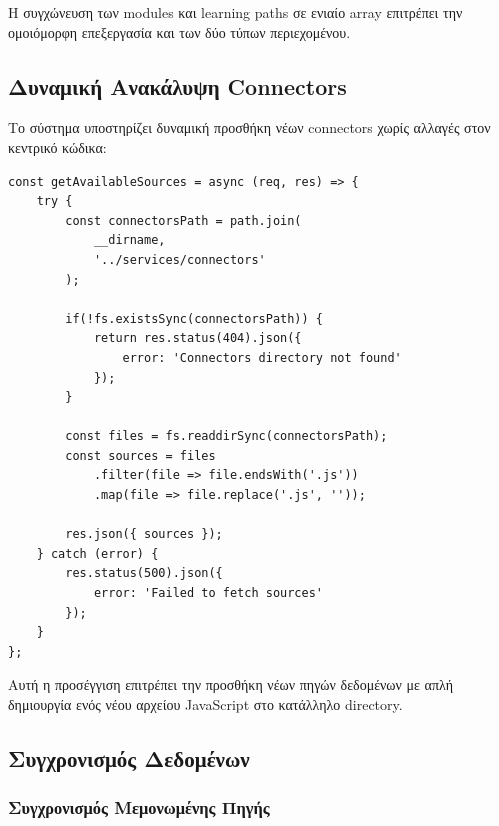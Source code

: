 \documentclass[a4paper,12pt]{article}
\begin{document}
Η συγχώνευση των modules και learning paths σε ενιαίο array επιτρέπει την ομοιόμορφη επεξεργασία και των δύο τύπων περιεχομένου.

\subsection{Δυναμική Ανακάλυψη Connectors}

Το σύστημα υποστηρίζει δυναμική προσθήκη νέων connectors χωρίς αλλαγές στον κεντρικό κώδικα:

\begin{verbatim}
const getAvailableSources = async (req, res) => {
    try {
        const connectorsPath = path.join(
            __dirname, 
            '../services/connectors'
        );
        
        if(!fs.existsSync(connectorsPath)) {
            return res.status(404).json({ 
                error: 'Connectors directory not found' 
            });
        }
        
        const files = fs.readdirSync(connectorsPath);
        const sources = files
            .filter(file => file.endsWith('.js'))
            .map(file => file.replace('.js', ''));
            
        res.json({ sources });
    } catch (error) {
        res.status(500).json({ 
            error: 'Failed to fetch sources' 
        });
    }
};
\end{verbatim}

Αυτή η προσέγγιση επιτρέπει την προσθήκη νέων πηγών δεδομένων με απλή δημιουργία ενός νέου αρχείου JavaScript στο κατάλληλο directory.

\subsection{Συγχρονισμός Δεδομένων}

\subsubsection{Συγχρονισμός Μεμονωμένης Πηγής}
\end{document}
